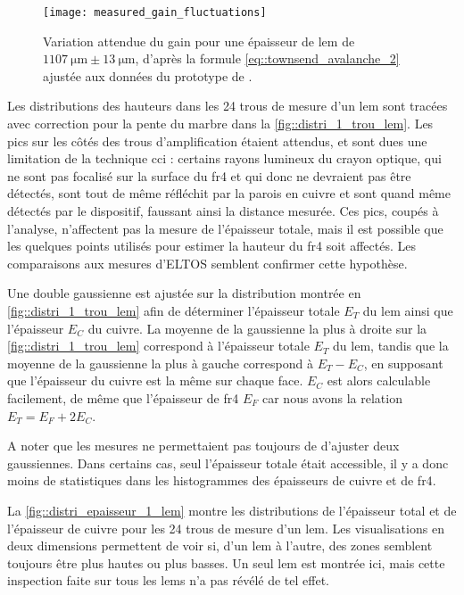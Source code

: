         \begin{figure}[htbp]
          \centering
          \texttt{[image: measured\_gain\_fluctuations]}
          \caption[Variation attendues du gain pour l'épaisseur moyennes des \glspl{lem} mesurés.]{\label{fig::exp_gain_range}Variation attendue du gain pour une épaisseur de \gls{lem} de $\SI{1107}{\micro\meter}\pm\SI{13}{\micro\meter}$, d'après la formule \eqref{eq::townsend_avalanche_2} ajustée aux données du prototype de \threeL{}\cite{Cantini2014}.}
        \end{figure}
                
        Les distributions des hauteurs dans les 24 trous de mesure d'un \gls{lem} sont tracées avec correction pour la pente du marbre dans la \autoref{fig::distri_1_trou_lem}. Les pics sur les côtés des trous d'amplification étaient attendus, et sont dues une limitation de la technique \gls{cci} : certains rayons lumineux du crayon optique, qui ne sont pas focalisé sur la surface du \gls{fr4} et qui donc ne devraient pas être détectés, sont tout de même réfléchit par la parois en cuivre et sont quand même détectés par le dispositif, faussant ainsi la distance mesurée. Ces pics, coupés à l'analyse, n'affectent pas la mesure de l'épaisseur totale, mais il est possible que les quelques points utilisés pour estimer la hauteur du \gls{fr4} soit affectés. Les comparaisons aux mesures d'ELTOS semblent confirmer cette hypothèse.
                
        Une double gaussienne est ajustée sur la distribution montrée en \autoref{fig::distri_1_trou_lem} afin de déterminer l'épaisseur totale $E_T$ du \gls{lem} ainsi que l'épaisseur $E_C$ du cuivre. La moyenne de la gaussienne la plus à droite sur la \autoref{fig::distri_1_trou_lem} correspond à l'épaisseur totale $E_T$ du \gls{lem}, tandis que la moyenne de la gaussienne la plus à gauche correspond à $E_T - E_C$, en supposant que l'épaisseur du cuivre est la même sur chaque face. $E_C$ est alors calculable facilement, de même que l'épaisseur de \gls{fr4} $E_F$ car nous avons la relation $E_T = E_F + 2E_C$.
                
        A noter que les mesures ne permettaient pas toujours de d'ajuster deux gaussiennes. Dans certains cas, seul l'épaisseur totale était accessible, il y a donc moins de statistiques dans les histogrammes des épaisseurs de cuivre et de \gls{fr4}.
                
        La \autoref{fig::distri_epaisseur_1_lem} montre les distributions de l'épaisseur total et de l'épaisseur de cuivre pour les 24 trous de mesure d'un \gls{lem}. Les visualisations en deux dimensions permettent de voir si, d'un \gls{lem} à l'autre, des zones semblent toujours être plus hautes ou plus basses. Un seul \gls{lem} est montrée ici, mais cette inspection faite sur tous les \glspl{lem} n'a pas révélé de tel effet.
                
